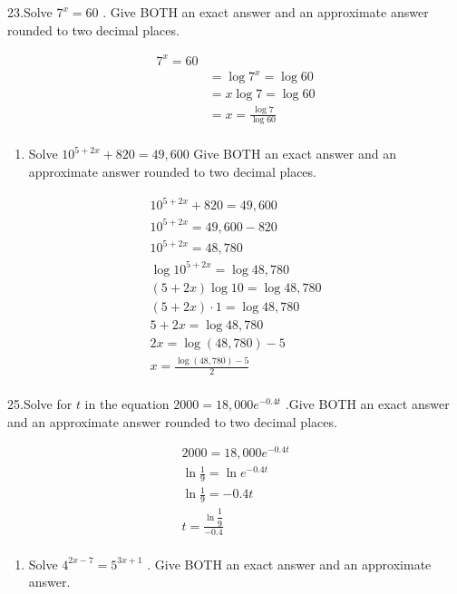 \documentclass{book}
\begin{document}
23.Solve \(7^{x}=60\) . Give BOTH an exact answer and an approximate
answer rounded to two decimal places.


	\begin{align}
		7^{x}=60 \\&= \log 7^{x}=\log 60 \\&= x\log 7=\log 60 \\&= x=\frac{\log 7}{\log 60} \\
	\end{align}


\begin{enumerate}
	\def\labelenumi{\arabic{enumi}.}
	\setcounter{enumi}{23}
	\tightlist
	\item
	      Solve \(10^{5+2x}+820=49,600\) Give BOTH an exact answer and an
	      approximate answer rounded to two decimal places.
\end{enumerate}


	\begin{align}
		10^{5+2x}+820=49,600 \\ 10^{5+2x}=49,600-820 \\ 10^{5+2x}=48,780\\ \log 10^{5+2x}=\log 48,780 \\ (5+2x)\log 10=\log 48,780 \\ (5+2x) \cdot 1=\log 48,780  \\ 5+2x =\log 48,780 \\ 2x =\log (48,780) -5 \\ x = \frac{\log (48,780) -5}{2} \\
	\end{align}


25.Solve for \(t\) in the equation \(2000=18,000e^{-0.4t}\) .Give BOTH
an exact answer and an approximate answer rounded to two decimal places.


	\begin{align}
		2000=18,000e^{-0.4t} \\ \ln \frac{1}{9}= \ln e^{-0.4t} \\ \ln \frac{1}{9}= -0.4t \\ t = \frac{\ln \dfrac{1}{9}}{-0.4}\\
	\end{align}


\begin{enumerate}
	\def\labelenumi{\arabic{enumi}.}
	\setcounter{enumi}{25}
	\tightlist
	\item
	      Solve \(4^{2x-7}=5^{3x+1}\) . Give BOTH an exact answer and an
	      approximate answer.
\end{enumerate}
\end{document}
